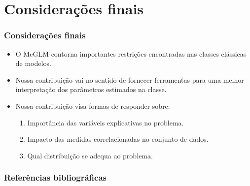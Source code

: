 \documentclass[10pt,
  aspectratio=169,
  serif,
  mathserif,
  professionalfont,
  compress,
  handout,
  ]{beamer}\usepackage[]{graphicx}\usepackage[]{color}
\begin{document}




\section{Considerações finais}


\begin{frame}
  \frametitle{Considerações finais}
  
\begin{itemize}
\itemsep 2ex
  \item O McGLM contorna importantes restrições encontradas nas classes clássicas de modelos.

    \item Nossa contribuição vai no sentido de fornecer ferramentas para uma melhor interpretação dos parâmetros estimados na classe.
    
    \item Nossa contribuição visa formas de responder sobre:
    
    \begin{enumerate}
      \item Importância das variáveis explicativas no problema.
      \item Impacto das medidas correlacionadas no conjunto de dados.
      \item Qual distribuição se adequa ao problema.
    \end{enumerate}

\end{itemize}

\end{frame}


\begin{frame}[c, allowframebreaks]
  \frametitle{Referências bibliográficas}
  
  \begin{tiny}
    
  \end{tiny}
  
\end{frame}
\end{document}
